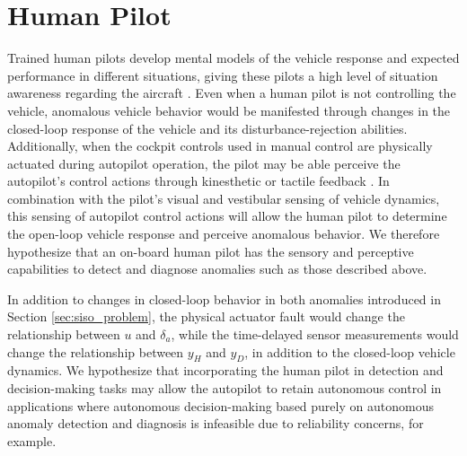 
\section{Human Pilot} \label{sec:siso_sc_human}
Trained human pilots develop mental models of the vehicle response and expected performance in different situations, giving these pilots a high level of situation awareness regarding the aircraft \cite{endsley1995toward}. Even when a human pilot is not controlling the vehicle, anomalous vehicle behavior would be manifested through changes in the closed-loop response of the vehicle and its disturbance-rejection abilities. Additionally, when the cockpit controls used in manual control are physically actuated during autopilot operation, the pilot may be able perceive the autopilot's control actions through kinesthetic or tactile feedback \cite{tan1994human, yang2007development}. In combination with the pilot's visual and vestibular sensing of vehicle dynamics, this sensing of autopilot control actions will allow the human pilot to determine the open-loop vehicle response and perceive anomalous behavior. We therefore hypothesize that an on-board human pilot has the sensory and perceptive capabilities to detect and diagnose anomalies such as those described above. 

In addition to changes in closed-loop behavior in both anomalies introduced in Section \ref{sec:siso_problem}, the physical actuator fault would change the relationship between $u$ and $\delta_a$, while the time-delayed sensor measurements would change the relationship between $y_{H}$ and $y_{D}$, in addition to the closed-loop vehicle dynamics. We hypothesize that incorporating the human pilot in detection and decision-making tasks may allow the autopilot to retain autonomous control in applications where autonomous decision-making based purely on autonomous anomaly detection and diagnosis is infeasible due to reliability concerns, for example. 



